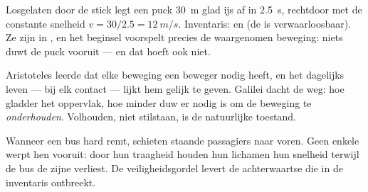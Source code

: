 \begin{example}[De ijshockeypuck]\label{ex:g10:inertia:puck}
Losgelaten door de stick legt een puck \qty{30}{m} glad ijs af in
\qty{2.5}{s}, rechtdoor met de constante snelheid
$v = 30/2.5 = \qty{12}{m/s}$. Inventaris:  en  (de
 is verwaarloosbaar). Ze zijn in , en het beginsel
voorspelt precies de waargenomen beweging: niets duwt de puck vooruit
--- en dat hoeft ook niet.
\end{example}

\begin{remark}
Aristoteles leerde dat elke beweging een beweger nodig heeft, en het
dagelijks leven ---  bij elk contact --- lijkt hem gelijk te
geven. Galilei dacht de  weg: hoe gladder het oppervlak, hoe
minder duw er nodig is om de beweging te \emph{onderhouden}. Volhouden,
niet stilstaan, is de natuurlijke toestand.
\end{remark}

\begin{remark}
Wanneer een bus hard remt, schieten staande passagiers naar voren. Geen
enkele  werpt hen vooruit: door hun traagheid houden hun lichamen
hun snelheid terwijl de bus de zijne verliest. De veiligheidsgordel
levert de achterwaartse  die in de inventaris ontbreekt.
\end{remark}

